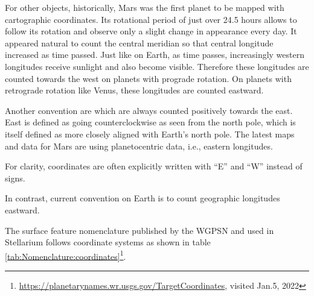 For other objects, historically, Mars was the first planet to be
mapped with cartographic coordinates. Its rotational period of just
over 24.5 hours allows to follow its rotation and observe only a
slight change in appearance every day. It appeared natural to count
the central meridian so that central longitude increased as time
passed. Just like on Earth, as time passes, increasingly western
longitudes receive sunlight and also become visible. Therefore these
 longitudes are
counted towards the west on planets with prograde rotation.  On
planets with retrograde rotation like Venus, these longitudes are
counted eastward.

Another convention are
which are always counted positively towards the east. East is defined
as going counterclockwise as seen from the north pole, which is itself
defined as more closely aligned with Earth's north pole. The latest
maps and data for Mars are using planetocentric data, i.e., eastern
longitudes.

For clarity, coordinates are often explicitly written with ``E'' and
``W'' instead of signs.

In contrast, current convention on Earth is to count geographic longitudes
eastward.



The surface feature nomenclature published by the WGPSN and used in Stellarium follows
coordinate systems as shown in table
\ref{tab:Nomenclature:coordinates}\footnote{\url{https://planetarynames.wr.usgs.gov/TargetCoordinates}, visited Jan.5, 2022}.

